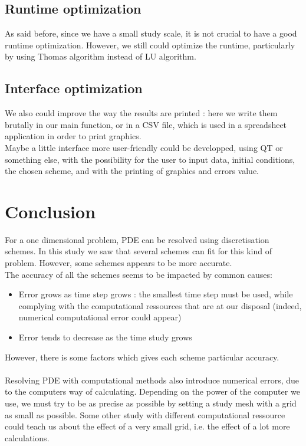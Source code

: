 \documentclass{article}
\begin{document}
        \subsection{Runtime optimization}
            As said before, since we have a small study scale, it is not crucial to have a good
            runtime optimization. However, we still could optimize the runtime, particularly
            by using Thomas algorithm instead of LU algorithm.
        \subsection{Interface optimization}
            We also could improve the way the results are printed : here we write them brutally
            in our main function, or in a CSV file, which is used in a spreadsheet application
            in order to print graphics.
            \\
            Maybe a little interface more user-friendly could be developped, using QT or something
            else, with the possibility for the user to input data, initial conditions, the chosen
            scheme, and with the printing of graphics and errors value.

    \newpage
    \section{Conclusion}
        For a one dimensional problem, PDE can be resolved using discretisation schemes. In this study
        we saw that several schemes can fit for this kind of problem. However, some schemes appears to
        be more accurate.\\
        The accuracy of all the schemes seems to be impacted by common causes:
        \begin{itemize}
            \item{Error grows as time step grows : the smallest time step must be used, while complying with
            the computational ressources that are at our disposal (indeed, numerical computational error could appear)}
            \item{Error tends to decrease as the time study grows}
        \end{itemize}
        
        However, there is some factors which gives each scheme particular accuracy.\\
        \\
        Resolving PDE with computational methods also introduce numerical errors, due to the computers way
        of calculating. Depending on the power of the computer we use, we must try to be as precise as possible
        by setting a study mesh with a grid as small as possible. Some other study with different computational ressource
        could teach us about the effect of a very small grid, i.e. the effect of a lot more calculations.
        
\end{document}
